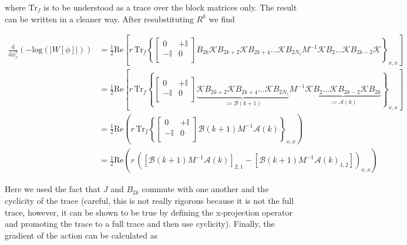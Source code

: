 \documentclass{article}
\begin{document}
where $\mathrm{Tr} _{f}$ is to be understood as a trace over the block matrices only. The result can be written in a cleaner way. After resubstituting $R^{k}$ we find

\begin{align}
	\frac{\mathrm{d} }{\mathrm{d}\phi^{k}_{x} }\left(-\mathrm{log} \left(|W[\phi]|\right)   \right) &= \frac{1}{2} \mathrm{Re} \left[r \, \mathrm{Tr} _{f} \left\{ \begin{bmatrix}
		0 & +\mathbb{I} \\
		-\mathbb{I} & 0 \\
	\end{bmatrix}    B_{2k} \mathcal{K} B_{2k+2}\mathcal{K} B_{2k + 4}...\mathcal{K} B_{2N_\tau}M^{-1}\mathcal{K} B_{2}...\mathcal{K} B_{2k-2}\mathcal{K}\right\}_{x,x} \right] \\
	&= \frac{1}{2}\mathrm{Re} \left[r\, \mathrm{Tr} _{f} \left\{ \begin{bmatrix}
		0 & +\mathbb{I} \\
		-\mathbb{I} & 0 \\
	\end{bmatrix}   \underbrace{ \mathcal{K} B_{2k+2}\mathcal{K} B_{2k + 4}...\mathcal{K} B_{2N_\tau}}_{:=\mathcal{B}(k+1)}M^{-1}\underbrace{\mathcal{K} B_{2}...\mathcal{K} B_{2k-2}\mathcal{K}B_{2k}}_{:= \mathcal{A}(k)}  \right\}_{x,x} \right] \\
	&= \frac{1}{2} \mathrm{Re}\left(  r\, \mathrm{Tr} _{f} \left\{  \begin{bmatrix}
		0 & +\mathbb{I} \\
		-\mathbb{I} & 0 \\
	\end{bmatrix} \mathcal{B}\left(k+1\right)M^{-1} \mathcal{A}\left(k\right)    \right\}_{x,x}\right)\\
	&= \frac{1}{2}\mathrm{Re}\left(  r\,  \left(\left[\mathcal{B}\left(k+1\right)M^{-1} \mathcal{A}\left(k\right)\right]_{2,1} - \left[\mathcal{B}\left(k+1\right)M^{-1} \mathcal{A}\left(k\right)_{1,2}\right]  \right)_{x,x}  \right)
\end{align} 



Here we used the fact that $J$ and $B_{2k}$ commute with one another and the cyclicity of the trace (careful, this is not really rigorous because it is not the full trace, however, it can be shown to be true by defining the x-projection operator and promoting the trace to a full trace and then use cyclicity). Finally, the gradient of the action can be calculated as
\end{document}
